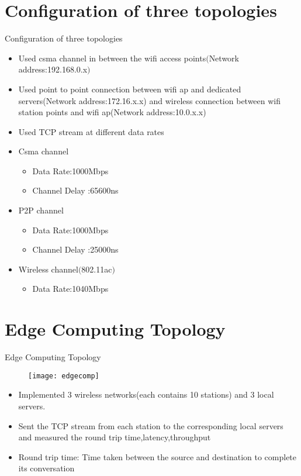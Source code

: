 \documentclass{beamer}
\begin{document}
\section{Configuration of three topologies}
\begin{frame}{Configuration of three topologies}
\begin{itemize}
	\item Used csma channel in between the wifi access points$($Network address:192.168.0.x$)$
	\item Used point to point connection between wifi ap and dedicated servers(Network address:172.16.x.x) and wireless connection between wifi station points and wifi ap(Network address:10.0.x.x)
	\item Used TCP stream at different data rates
	\item Csma channel
	\begin{itemize}
		\item Data Rate:1000Mbps
		\item Channel Delay :65600ns
	\end{itemize}
	\item P2P channel
	\begin{itemize}
		\item Data Rate:1000Mbps
		\item Channel Delay :25000ns
	\end{itemize}
	\item Wireless channel$($802.11ac$)$
	\begin{itemize}
		\item Data Rate:1040Mbps
	\end{itemize}
	
\end{itemize}
\end{frame}
\section{Edge Computing Topology}

\begin{frame}{Edge Computing Topology}
\begin{figure}
\texttt{[image: edgecomp]}
\centering
\end{figure}

\begin{itemize}
	\item Implemented 3 wireless networks(each contains 10 stations) and 3 local servers. 
	\item Sent the TCP stream from each station to the corresponding local servers and measured the round trip time,latency,throughput
	\item Round trip time: Time taken between the source and destination to complete its conversation

\end{itemize}

\end{frame}
\end{document}
